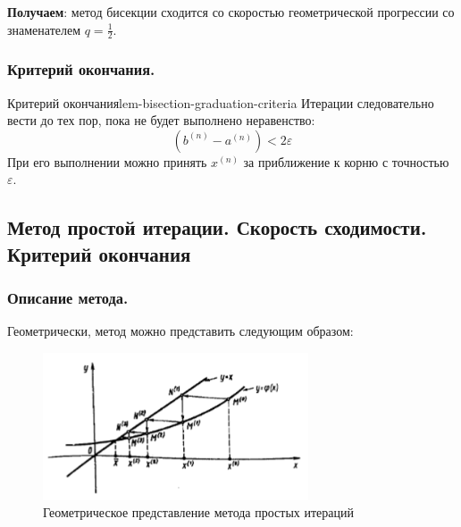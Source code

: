 \documentclass[14pt]{extarticle}
\begin{document}
        \textbf{Получаем}: метод бисекции сходится со скоростью геометрической прогрессии со знаменателем $q = \frac{1}{2}$.


    \subsubsection{Критерий окончания.}

        \begin{lemma}{Критерий окончания}{lem-bisection-graduation-criteria}
            Итерации следовательно вести до тех пор, пока не будет выполнено неравенство:
            $$(b^{(n)} - a^{(n)}) < 2\varepsilon$$
            При его выполнении можно принять $x^{(n)}$ за приближение к корню с точностью $\varepsilon$.
        \end{lemma}

\clearpage
\subsection{Метод простой итерации. Скорость сходимости. Критерий окончания}

    \subsubsection{Описание метода.}

        Геометрически, метод можно представить следующим образом:

        \begin{figure}[H]
            \centering
            \includegraphics[width=0.7\textwidth]{images/simple-iterations-ex.png}
            \caption{Геометрическое представление метода простых итераций}
            \label{fig:simple-iterations-example}
        \end{figure}
\end{document}
